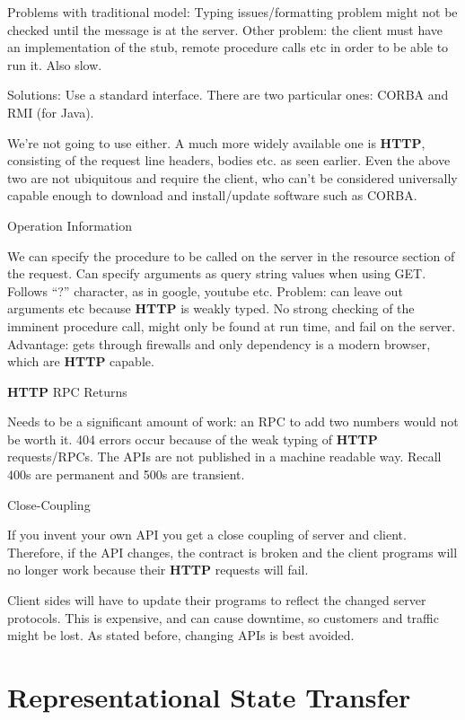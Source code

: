 \documentclass[11pt]{article}
\begin{document}
Problems with traditional model:
Typing issues/formatting problem might not be checked until the message is at the server.
Other problem: the client must have an implementation of the stub, remote procedure calls etc in order to be able to run it.
Also slow.

Solutions:
Use a standard interface. There are two particular ones: CORBA and RMI (for Java). 

We’re not going to use either. A much more widely available one is \textbf{HTTP}, consisting of the request line headers, bodies etc. as seen earlier. Even the above two are not ubiquitous and require the client, who can’t be considered universally capable enough to download and install/update software such as CORBA.

Operation Information

We can specify the procedure to be called on the server in the resource section of the request.
Can specify arguments as query string values when using GET. Follows “?” character, as in google, youtube etc. Problem: can leave out arguments etc because \textbf{HTTP} is weakly typed. No strong checking of the imminent procedure call, might only be found at run time, and fail on the server. Advantage: gets through firewalls and only dependency is a modern browser, which are \textbf{HTTP} capable.

\textbf{HTTP} RPC Returns

Needs to be a significant amount of work: an RPC to add two numbers would not be worth it.
404 errors occur because of the weak typing of \textbf{HTTP} requests/RPCs. The APIs are not published in a machine readable way. Recall 400s are permanent and 500s are transient.

Close-Coupling

If you invent your own API you get a close coupling of server and client. Therefore, if the API changes, the contract is broken and the client programs will no longer work because their \textbf{HTTP} requests will fail.

Client sides will have to update their programs to reflect the changed server protocols. This is expensive, and can cause downtime, so customers and traffic might be lost. As stated before, changing APIs is best avoided.




\section{Representational State Transfer}
\label{sec:REST}
\end{document}
